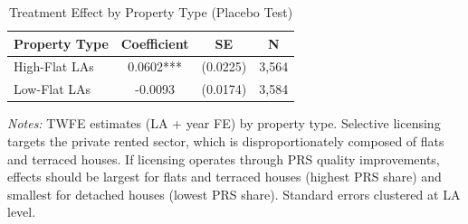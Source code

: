 \begin{table}[t]
\centering
\caption{Treatment Effect by Property Type (Placebo Test)}
\label{tab:placebo}
\begin{tabular}{lccc}
\toprule
Property Type & Coefficient & SE & N \\
\midrule
High-Flat LAs & 0.0602*** & (0.0225) & 3,564 \\
Low-Flat LAs & -0.0093 & (0.0174) & 3,584 \\
\bottomrule
\end{tabular}
\begin{tablenotes}[flushleft]
\small
\item \textit{Notes:} TWFE estimates (LA + year FE) by property type. Selective licensing targets the private rented sector, which is disproportionately composed of flats and terraced houses. If licensing operates through PRS quality improvements, effects should be largest for flats and terraced houses (highest PRS share) and smallest for detached houses (lowest PRS share). Standard errors clustered at LA level.
\end{tablenotes}
\end{table}
